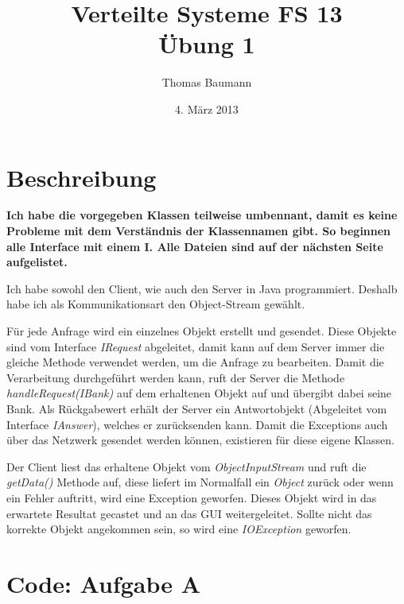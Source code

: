 \documentclass[10pt]{article}
\title{
	\vspace{5cm}
	Verteilte Systeme FS 13\\
	Übung 1
}
\author{Thomas Baumann}
\date{4. März 2013}
\newcommand{\Bold}[1]{\textbf{#1}} %
\newcommand{\Kursiv}[1]{\textit{#1}} %
\let\stdsection\section
\renewcommand{\section}{\newpage\stdsection}
\begin{document}
\maketitle
\thispagestyle{fancy}

\newpage

\tableofcontents	  	


\newpage
\setcounter{page}{1}

\section{Beschreibung}
\Bold{Ich habe die vorgegeben Klassen teilweise umbennant, damit es keine 
Probleme mit dem Verständnis der Klassennamen gibt. So beginnen alle Interface mit einem I. 
Alle Dateien sind auf der nächsten Seite aufgelistet.}

Ich habe sowohl den Client, wie auch den Server in Java programmiert. Deshalb habe ich als 
Kommunikationsart den Object-Stream gewählt.

Für jede Anfrage wird ein einzelnes Objekt erstellt und gesendet. Diese Objekte sind vom 
Interface \Kursiv{IRequest} abgeleitet, damit kann auf dem Server immer die gleiche 
Methode verwendet werden, um die Anfrage zu bearbeiten. Damit die Verarbeitung 
durchgeführt werden kann, ruft der Server die Methode \Kursiv{handleRequest(IBank)} auf 
dem erhaltenen Objekt auf und übergibt dabei seine Bank. Als Rückgabewert erhält der 
Server ein Antwortobjekt (Abgeleitet vom Interface \Kursiv{IAnswer}), welches er 
zurücksenden kann. Damit die Exceptions auch über das Netzwerk gesendet werden können, 
existieren für diese eigene Klassen.

Der Client liest das erhaltene Objekt vom \Kursiv{ObjectInputStream} und ruft die 
\Kursiv{getData()} Methode auf, diese liefert im Normalfall ein \Kursiv{Object} zurück 
oder wenn ein Fehler auftritt, wird eine Exception geworfen. Dieses Objekt wird in 
das erwartete Resultat gecastet und an das GUI weitergeleitet. Sollte nicht das korrekte 
Objekt angekommen sein, so wird eine \Kursiv{IOException} geworfen.




\section{Code: Aufgabe A}



\end{document}
